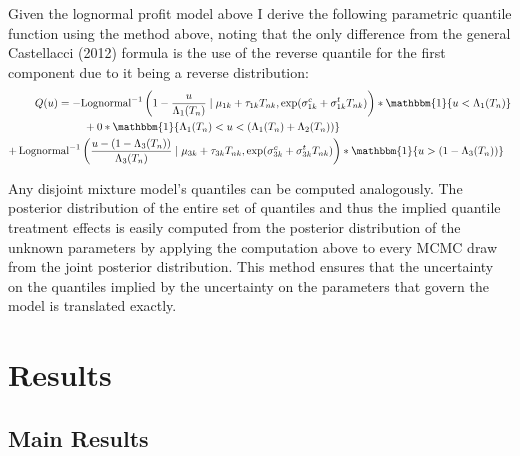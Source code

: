 \documentclass[english,12pt]{article}\usepackage{lmodern}
\numberwithin{equation}{section}
\begin{document}
 Given the lognormal profit model above I derive the following parametric quantile function using the method above, noting that the only difference from the general Castellacci (2012) formula is the use of the reverse quantile for the first component due to it being a reverse distribution:
\begin{equation}
\begin{aligned}
Q(u) = -&\text{Lognormal}^{-1}\left( 1-  \frac{u}{\Lambda_{1}(T_n)} \mid \mu_{1k} + \tau_{1k}T_{nk} ,  \exp(\sigma^{c}_{1k} + \sigma^{t}_{1k} T_{nk}) \right)* \mathbbm{1}\{ u < \Lambda_{1}(T_n)\} \\
 &\;+ 0*  \mathbbm{1}\{ \Lambda_1(T_n) < u < (\Lambda_{1}(T_n) +\Lambda_{2}(T_{n}))\} \\
+ \,\text{Lognormal}^{-1}&\left(   \frac{u - (1 - \Lambda_3(T_n))}{\Lambda_{3}(T_n)} \mid \mu_{3k} + \tau_{3k}T_{nk} ,  \exp(\sigma^{c}_{3k} + \sigma^{t}_{3k} T_{nk}) \right)* \mathbbm{1}\{ u >  (1-\Lambda_{3}(T_n))\}
\end{aligned} \end{equation}

Any disjoint mixture model's quantiles can be computed analogously.  The posterior distribution of the entire set of quantiles and thus the implied quantile treatment effects is easily computed from the posterior distribution of the unknown parameters by applying the computation above to every MCMC draw from the joint posterior distribution. This method ensures that the uncertainty on the quantiles implied by the uncertainty on the parameters that govern the model is translated exactly.



\section{Results}

\subsection{Main Results}
\end{document}
